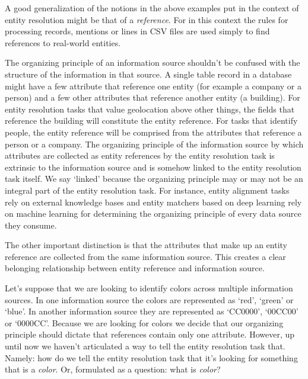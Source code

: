 \documentclass[11pt]{article}
\begin{document}
    A good generalization of the notions in the above examples put in the
    context of entity resolution might be that of a
    \textit{reference}\cite{Ben2009Swoosh}.
    For in this context the rules for processing records, mentions or lines in
    CSV files are used simply to find references to real-world entities.

    The organizing principle of an information source shouldn't be confused with
    the structure of the information in that source.
    A single table record in a database might have a few attribute that
    reference one entity (for example a company or a person) and a few other
    attributes that reference another entity (a building).
    For entity resolution tasks that value geolocation above other things, the 
    fields that reference the building will constitute the entity reference.
    For tasks that identify people, the entity reference will be comprised from
    the attributes that reference a person or a company.
    The organizing principle of the information source by which attributes are
    collected as entity references by the entity resolution task is extrinsic to
    the information source and is somehow linked to the entity resolution task
    itself.
    We say `linked' because the organizing principle may or may not be an
    integral part of the entity resolution task.
    For instance, entity alignment tasks rely on external knowledge bases and
    entity matchers based on deep learning rely on machine learning for
    determining the organizing principle of every data source they consume.

    The other important distinction is that the attributes that make up an
    entity reference are collected from the same information source.
    This creates a clear belonging relationship between entity reference and
    information source.
    
    Let's suppose that we are looking to identify colors across multiple
    information sources.
    In one information source the colors are represented as `red', `green' or 
    `blue'.
    In another information source they are represented as `CC0000', `00CC00' or
    `0000CC'.
    Because we are looking for colors we decide that our organizing principle
    should dictate that references contain only one attribute.
    However, up until now we haven't articulated a way to tell the entity
    resolution task that.
    Namely: how do we tell the entity resolution task that it's looking for
    something that is a \textit{color}.
    Or, formulated as a question: what is \textit{color}?
\end{document}
